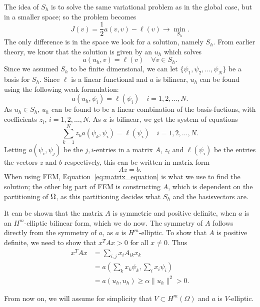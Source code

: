 The idea of $S_h$ is to solve the same variational problem as in the global case, 
but in a smaller space; so the problem becomes
\begin{equation*}
    J(v) = \frac{1}{2}a(v,v) - \ell(v) \to \underset{S_h}{\min}.
\end{equation*}
The only difference is in the space we look for a solution, namely $S_h$. From 
earlier theory, we know that the solution is given by an $u_h$ which solves
\begin{equation*}
    a(u_h,v) = \ell(v) \quad \forall v \in S_h.
\end{equation*}
Since we assumed $S_h$ to be finite dimensional, we can let $ \{ \psi_1, \psi_2, \ldots, \psi_N \}$ 
be a basis for $S_h$. Since $\ell$ is a linear functional and $a$ is bilinear, 
$u_h$ can be found using the following weak formulation:
\begin{equation*}
    a(u_h, \psi_i) = \ell(\psi_i) \quad i = 1, 2, \ldots, N.
\end{equation*}
As $u_h \in S_h$, $u_h$ can be found to be a linear combination of the basis-fuctions, with 
coefficients $z_i$, $i=1, 2, \ldots, N$. As $a$ is bilinear, we get the system of 
equations
\begin{equation*}
    \sum_{k=1}^N z_k a(\psi_k,\psi_i) = \ell(\psi_i) \quad i = 1,2,\ldots,N.
\end{equation*}
Letting $a(\psi_i,\psi_j)$ be the $j,i$-entries in a matrix $A$, $z_i$ and $\ell(\psi_i)$ 
be the entries the vectors $z$ and $b$ respectively, this can be written in matrix form 
\begin{equation}
    Az = b. \label{eq:matrix_equation}
\end{equation}
When using FEM, Equation~\eqref{eq:matrix_equation} is what we use to find the solution; 
the other big part of FEM is constructing $A$, which is dependent on the partitioning of $\Omega$, 
as this partitioning decides what $S_h$ and the basisvectors are.

It can be shown that the matrix $A$ is symmetric and positive definite, when $a$ is an $H^m$-elliptic bilinear form, which we do now. 
The symmetry of $A$ follows directly from the symmetry of $a$, as $a$ is $H^m$-elliptic.
To show that $A$ is positive definite, we need to show that $x^T Ax > 0$ for all $x \neq 0$. Thus
\begin{align*}
    x^T Ax &= \sum_{i,j} x_i A_{ik}x_k \\
    &= a\left(\sum_{k} x_k\psi_k,\sum_{i} x_i\psi_i\right) \\
    &= a(u_h,u_h) \geq \alpha \|u_h\|^2 > 0.
\end{align*}

From now on, we will assume for simplicity that $V\subset H^m(\Omega)$ and $a$ is $V$-elliptic. %

